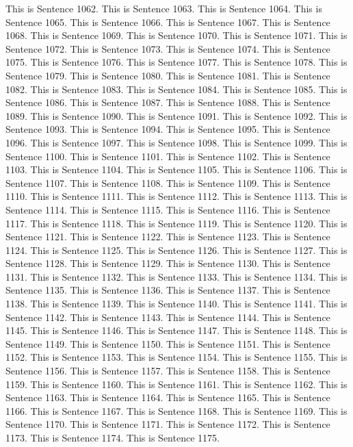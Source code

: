 \documentclass{article}
\begin{document}
This is Sentence 1062.
This is Sentence 1063.
This is Sentence 1064.
This is Sentence 1065.
This is Sentence 1066.
This is Sentence 1067.
This is Sentence 1068.
This is Sentence 1069.
This is Sentence 1070.
This is Sentence 1071.
This is Sentence 1072.
This is Sentence 1073.
This is Sentence 1074.
This is Sentence 1075.
This is Sentence 1076.
This is Sentence 1077.
This is Sentence 1078.
This is Sentence 1079.
This is Sentence 1080.
This is Sentence 1081.
This is Sentence 1082.
This is Sentence 1083.
This is Sentence 1084.
This is Sentence 1085.
This is Sentence 1086.
This is Sentence 1087.
This is Sentence 1088.
This is Sentence 1089.
This is Sentence 1090.
This is Sentence 1091.
This is Sentence 1092.
This is Sentence 1093.
This is Sentence 1094.
This is Sentence 1095.
This is Sentence 1096.
This is Sentence 1097.
This is Sentence 1098.
This is Sentence 1099.
This is Sentence 1100.
This is Sentence 1101.
This is Sentence 1102.
This is Sentence 1103.
This is Sentence 1104.
This is Sentence 1105.
This is Sentence 1106.
This is Sentence 1107.
This is Sentence 1108.
This is Sentence 1109.
This is Sentence 1110.
This is Sentence 1111.
This is Sentence 1112.
This is Sentence 1113.
This is Sentence 1114.
This is Sentence 1115.
This is Sentence 1116.
This is Sentence 1117.
This is Sentence 1118.
This is Sentence 1119.
This is Sentence 1120.
This is Sentence 1121.
This is Sentence 1122.
This is Sentence 1123.
This is Sentence 1124.
This is Sentence 1125.
This is Sentence 1126.
This is Sentence 1127.
This is Sentence 1128.
This is Sentence 1129.
This is Sentence 1130.
This is Sentence 1131.
This is Sentence 1132.
This is Sentence 1133.
This is Sentence 1134.
This is Sentence 1135.
This is Sentence 1136.
This is Sentence 1137.
This is Sentence 1138.
This is Sentence 1139.
This is Sentence 1140.
This is Sentence 1141.
This is Sentence 1142.
This is Sentence 1143.
This is Sentence 1144.
This is Sentence 1145.
This is Sentence 1146.
This is Sentence 1147.
This is Sentence 1148.
This is Sentence 1149.
This is Sentence 1150.
This is Sentence 1151.
This is Sentence 1152.
This is Sentence 1153.
This is Sentence 1154.
This is Sentence 1155.
This is Sentence 1156.
This is Sentence 1157.
This is Sentence 1158.
This is Sentence 1159.
This is Sentence 1160.
This is Sentence 1161.
This is Sentence 1162.
This is Sentence 1163.
This is Sentence 1164.
This is Sentence 1165.
This is Sentence 1166.
This is Sentence 1167.
This is Sentence 1168.
This is Sentence 1169.
This is Sentence 1170.
This is Sentence 1171.
This is Sentence 1172.
This is Sentence 1173.
This is Sentence 1174.
This is Sentence 1175.
\end{document}
